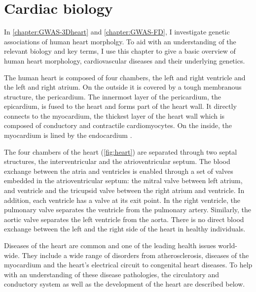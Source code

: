 \chapter{Cardiac biology}
\label{chapter:intro-heart}
In \cref{chapter:GWAS-3Dheart} and \cref{chapter:GWAS-FD}, I investigate genetic associations of human heart morpholgy. To aid with an understanding of the relevant biology and key terms, I use this chapter to give a basic overview of human heart morphology, cardiovascular diseases and their underlying genetics.

The human heart is composed of four chambers, the left and right ventricle and the left and right atrium. On the outside it is covered by a tough membranous structure, the pericardium. The innermost layer of the  pericardium, the epicardium, is fused to the heart and forms part of the heart wall. It directly connects to the myocardium, the thickest layer of the heart wall which is composed of conductory and contractile cardiomyocytes. On the inside, the myocardium is lined by the endocardium \citep{Betts2013}.  

The four chambers of the heart (\cref{fig:heart}) are separated through two septal structures, the interventricular and the atrioventricular septum. The blood exchange between the atria and ventricles is enabled through a set of valves embedded in the atrioventricular septum: the mitral valve between left atrium, and ventricle and the tricupsid valve between the right atrium and ventricle. In addition, each ventricle has a valve at its exit point. In the right ventricle, the pulmonary valve separates the ventricle from the pulmonary artery. Similarly, the aortic valve separates the left ventricle from the aorta. There is no direct blood exchange between the left and the right side of the heart in healthy individuals. 

Diseases of the heart are common and one of the leading health issues world-wide. They include a wide range of disorders from atherosclerosis, diseases of the myocardium and the heart’s electrical circuit to congenital heart diseases. To help with an understanding of these disease pathologies, the circulatory and conductory system as well as the development of the heart are described below.

